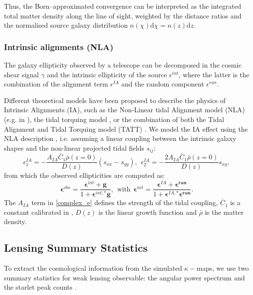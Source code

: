 \documentclass{aa}
\begin{document}
Thus, the Born–approximated convergence can be interpreted as the integrated total matter density along the line of sight, weighted by the distance ratios and the normalised source galaxy  distribution $n(\chi)$d$\chi=n(z)$d$z$.

\subsubsection{Intrinsic alignments (NLA)}

The galaxy ellipticity observed by a telescope can be decomposed in the cosmic shear signal $\gamma$ and the intrinsic ellipticity of the source $\epsilon^{int}$, where the latter is the combination of the alignment term $\epsilon^{IA}$ and the random component $\epsilon^{ran}$.

Different theoretical models have been proposed to describe the physics of Intrinsic Alignments (IA), such as the Non-Linear tidal Alignment model (NLA) (e.g. in \citet{Bridle_2007}), the tidal torquing model \citep{PhysRevD.70.063526, 10.1046/j.1365-8711.2001.04105.x}, or the combination of both the Tidal Alignment and Tidal Torquing model (TATT)  \citep{PhysRevD.100.103506}.
We model the IA effect using the NLA description \citep{harnois2021cosmic}, i.e. assuming a linear coupling between the intrinsic galaxy shapes and the non-linear projected tidal fields $s_{ij}$:
\begin{equation}\label{complex_e}
    \epsilon_{1}^{IA}=- \frac{A_{IA}\bar{C}_1\bar{\rho}(z=0)}{D(z)} (s_{xx}-s_{yy}), \ \ 
      \epsilon_{2}^{IA}=-\frac{2A_{IA}\bar{C}_1\bar{\rho}(z=0)}{D(z)} s_{xy},
\end{equation}
from which the observed ellipticities are computed as:
 \begin{equation}
    \boldsymbol{\epsilon}^{obs}=
    \frac{\boldsymbol{\epsilon}^{int}+\textbf{g}}{1+\boldsymbol{\epsilon}^{int,*}\textbf{g}}, \ \  \text{with}  \ \
    \boldsymbol{\epsilon}^{int}=
    \frac{\boldsymbol{\epsilon}^{
     IA}+\boldsymbol{\epsilon^{ran}}}
     {1+\boldsymbol{\epsilon}^{IA,*}\boldsymbol{\epsilon^{ran}}}.
\end{equation}
The $A_{IA}$ term in \autoref{complex_e} defines the strength of the tidal coupling, $\bar{C}_1$ is a constant
calibrated in \citet{brown2002measurement}, $D(z)$ is the linear growth function and $\bar{\rho}$ is the matter density.
 
\subsection{Lensing Summary Statistics }\label{stat}
To extract the cosmological information from the simulated $\kappa-$maps, we use two summary statistics for weak lensing observable: the angular power spectrum and the starlet peak counts \citep{lin2016new}. 
\end{document}
